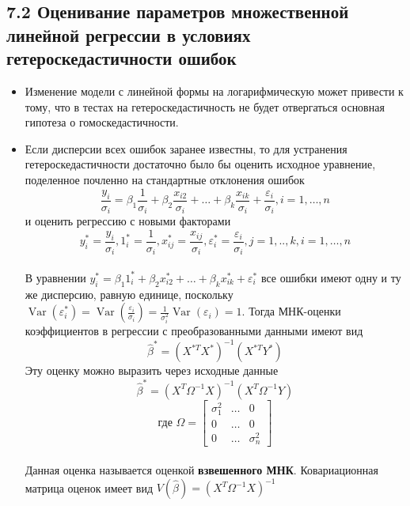 \documentclass[a0,final]{a0poster}
\DeclareMathOperator{\Var}{Var}
\begin{document}
\begin{multicols}{4}
\begin{itemize}
\end{itemize}

\subsection*{7.2 Оценивание параметров множественной линейной регрессии в условиях гетероскедастичности ошибок}
\begin{itemize}
\item Изменение модели с линейной формы на логарифмическую может привести к тому, что в тестах на гетероскедастичность не будет отвергаться основная гипотеза о гомоскедастичности.
\item Если дисперсии всех ошибок заранее известны, то для устранения гетероскедастичности достаточно было бы оценить исходное уравнение, поделенное почленно на стандартные отклонения ошибок\\
\[\frac{y_i}{\sigma_i} = \beta_1\frac{1}{\sigma_i} + \beta_2\frac{x_{i2}}{\sigma_i} + \ldots + \beta_k\frac{x_{ik}}{\sigma_i} + \frac{\varepsilon_i}{\sigma_i},  i = 1, \ldots, n\] и оценить регрессию с новыми факторами \\
\[y^*_i = \frac{y_i}{\sigma_i}, 1_i^* = \frac{1}{\sigma_i}, x_{ij}^* = \frac{x_{ij}}{\sigma_i}, \varepsilon_i^* = \frac{\varepsilon_i}{\sigma_i}, j = 1, .., k, i = 1, \ldots, n\] \\
В уравнении $y_i^* = \beta_1 1_i^* + \beta_2 x_{i2}^* + \ldots + \beta_k x_{ik}^* + \varepsilon_i^*$ все ошибки имеют одну и ту же дисперсию, равную единице, поскольку $\Var(\varepsilon^*_i) = \Var(\frac{\varepsilon_i}{\sigma_i}) = \frac{1}{\sigma_i^2}\Var(\varepsilon_i) = 1$.
Тогда МНК-оценки коэффициентов в регрессии с преобразованными данными имеют вид \[\hat{\beta}^* = (X^{*T}X^*)^{-1}(X^{*T}Y^*)\]
Эту оценку можно выразить через исходные данные \[\hat{\beta}^* = (X^T\Omega^{-1}X)^{-1}(X^T\Omega^{-1}Y)\] \[\text{где } \Omega =
\begin{bmatrix}
    \sigma_1^2 & \dots & 0 \\
    0          & \dots & 0 \\
    0          & \dots & \sigma^2_n
\end{bmatrix}\] \\
Данная оценка называется оценкой \textbf{взвешенного МНК}. Ковариационная матрица оценок имеет вид $V(\hat{\beta}) = (X^T\Omega^{-1}X)^{-1}$


\end{itemize}
\end{multicols}
\end{document}
